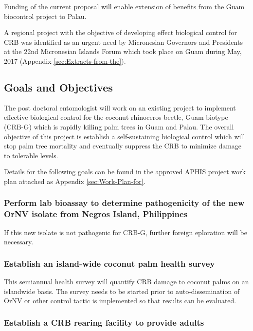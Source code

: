 \documentclass[12pt,letterpaper,english,bibliography=totocnumbered, abstract=on]{scrartcl}
\begin{document}
Funding of the current proposal will enable extension of benefits
from the Guam biocontrol project to Palau.

A regional project with the objective of developing effect biological
control for CRB was identified as an urgent need by Micronesian Governors
and Presidents at the 22nd Micronesian Islands Forum which took place
on Guam during May, 2017 (Appendix \ref{sec:Extracts-from-the}).

\subsection{Goals and Objectives}

The post doctoral entomologist will work on an existing project to
implement effective biological control for the coconut rhinoceros
beetle, Guam biotype (CRB-G) which is rapidly killing palm trees in
Guam and Palau. The overall objective of this project is establish
a self-sustaining biological control which will stop palm tree mortality
and eventually suppress the CRB to minimize damage to tolerable levels. 

Details for the following goals can be found in the approved APHIS
project work plan attached as Appendix \ref{sec:Work-Plan-for}.

\subsubsection{Perform lab bioassay to determine pathogenicity of the new OrNV isolate
from Negros Island, Philippines}

If this new isolate is not pathogenic for CRB-G, further foreign eploration
will be necessary.

\subsubsection{Establish an island-wide coconut palm health survey}

This semiannual health survey will quantify CRB damage to coconut
palms on an islandwide basis. The survey needs to be started prior
to auto-dissemination of OrNV or other control tactic is implemented
so that results can be evaluated.

\subsubsection{Establish a CRB rearing facility to provide adults}
\end{document}
